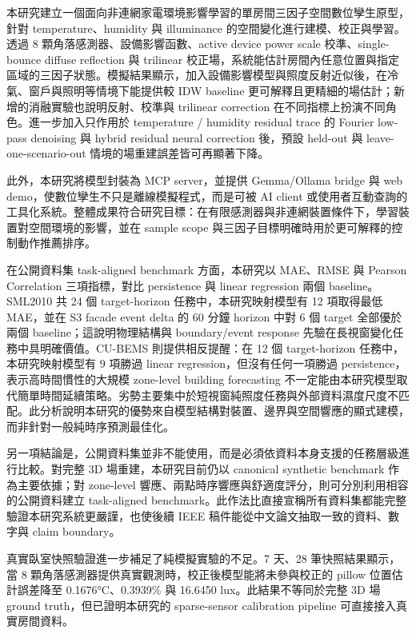 \documentclass[12pt,a4paper]{article}
\begin{document}
本研究建立一個面向非連網家電環境影響學習的單房間三因子空間數位孿生原型，針對 temperature、humidity 與 illuminance 的空間變化進行建模、校正與學習。透過 8 顆角落感測器、設備影響函數、active device power scale 校準、single-bounce diffuse reflection 與 trilinear 校正場，系統能估計房間內任意位置與指定區域的三因子狀態。模擬結果顯示，加入設備影響模型與照度反射近似後，在冷氣、窗戶與照明等情境下能提供較 IDW baseline 更可解釋且更精細的場估計；新增的消融實驗也說明反射、校準與 trilinear correction 在不同指標上扮演不同角色。進一步加入只作用於 temperature / humidity residual trace 的 Fourier low-pass denoising 與 hybrid residual neural correction 後，預設 held-out 與 leave-one-scenario-out 情境的場重建誤差皆可再顯著下降。


此外，本研究將模型封裝為 MCP server，並提供 Gemma/Ollama bridge 與 web demo，使數位孿生不只是離線模擬程式，而是可被 AI client 或使用者互動查詢的工具化系統。整體成果符合研究目標：在有限感測器與非連網裝置條件下，學習裝置對空間環境的影響，並在 sample scope 與三因子目標明確時用於更可解釋的控制動作推薦排序。


在公開資料集 task-aligned benchmark 方面，本研究以 MAE、RMSE 與 Pearson Correlation 三項指標，對比 persistence 與 linear regression 兩個 baseline。SML2010 共 24 個 target-horizon 任務中，本研究映射模型有 12 項取得最低 MAE，並在 S3 facade event delta 的 60 分鐘 horizon 中對 6 個 target 全部優於兩個 baseline；這說明物理結構與 boundary/event response 先驗在長視窗變化任務中具明確價值。CU-BEMS 則提供相反提醒：在 12 個 target-horizon 任務中，本研究映射模型有 9 項勝過 linear regression，但沒有任何一項勝過 persistence，表示高時間慣性的大規模 zone-level building forecasting 不一定能由本研究模型取代簡單時間延續策略。劣勢主要集中於短視窗純照度任務與外部資料濕度尺度不匹配。此分析說明本研究的優勢來自模型結構對裝置、邊界與空間響應的顯式建模，而非針對一般純時序預測最佳化。


另一項結論是，公開資料集並非不能使用，而是必須依資料本身支援的任務層級進行比較。對完整 3D 場重建，本研究目前仍以 canonical synthetic benchmark 作為主要依據；對 zone-level 響應、兩點時序響應與舒適度評分，則可分別利用相容的公開資料建立 task-aligned benchmark。此作法比直接宣稱所有資料集都能完整驗證本研究系統更嚴謹，也使後續 IEEE 稿件能從中文論文抽取一致的資料、數字與 claim boundary。


真實臥室快照驗證進一步補足了純模擬實驗的不足。7 天、28 筆快照結果顯示，當 8 顆角落感測器提供真實觀測時，校正後模型能將未參與校正的 pillow 位置估計誤差降至 0.1676°C、0.3939\% 與 16.6450 lux。此結果不等同於完整 3D 場 ground truth，但已證明本研究的 sparse-sensor calibration pipeline 可直接接入真實房間資料。
\end{document}
